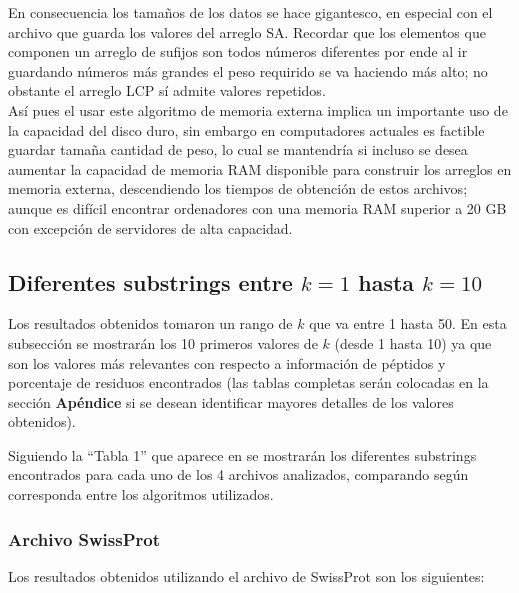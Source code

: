 En consecuencia los tamaños de los datos se hace gigantesco, en especial con el archivo que guarda los valores del arreglo SA. Recordar que los elementos que componen un arreglo de sufijos son todos números diferentes por ende al ir guardando números más grandes el peso requirido se va haciendo más alto; no obstante el arreglo LCP sí admite valores repetidos.\\
Así pues el usar este algoritmo de memoria externa implica un importante uso de la capacidad del disco duro, sin embargo en computadores actuales es factible guardar tamaña cantidad de peso, lo cual se mantendría si incluso se desea aumentar la capacidad de memoria RAM disponible para construir los arreglos en memoria externa, descendiendo los tiempos de obtención de estos archivos; aunque es difícil encontrar ordenadores con una memoria RAM superior a 20 GB con excepción de servidores de alta capacidad. 

\subsection{Diferentes substrings entre $k = 1$ hasta $k = 10$}

Los resultados obtenidos tomaron un rango de $k$ que va entre 1 hasta 50. En esta subsección se mostrarán los 10 primeros valores de $k$ (desde 1 hasta 10) ya que son los valores más relevantes con respecto a información de péptidos y porcentaje de residuos encontrados (las tablas completas serán colocadas en la sección \textbf{Apéndice} si se desean identificar mayores detalles de los valores obtenidos).

Siguiendo la ``Tabla 1'' que aparece en \cite{searching} se mostrarán los diferentes substrings encontrados para cada uno de los 4 archivos analizados, comparando según corresponda entre los algoritmos utilizados.

\subsubsection{Archivo SwissProt}

Los resultados obtenidos utilizando el archivo de SwissProt son los siguientes:

